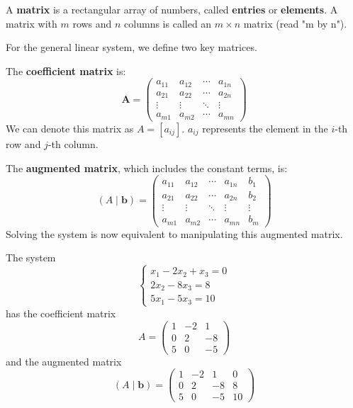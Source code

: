 \begin{definition}
A \textbf{matrix} is a rectangular array of numbers, called \textbf{entries} or \textbf{elements}. A matrix with $m$ rows and $n$ columns is called an $m \times n$ matrix (read "m by n").
\end{definition}

For the general linear system, we define two key matrices.

The \textbf{coefficient matrix} is:
\[ \textbf{A} = \begin{pmatrix}
a_{11} & a_{12} & \cdots & a_{1n} \\
a_{21} & a_{22} & \cdots & a_{2n} \\
\vdots & \vdots & \ddots & \vdots \\
a_{m1} & a_{m2} & \cdots & a_{mn}
\end{pmatrix} \]
We can denote this matrix as $A = [a_{ij}]$. $a_{ij}$ represents the element in the $i$-th row and $j$-th column.

The \textbf{augmented matrix}, which includes the constant terms, is:
\[ (A \mid \mathbf{b}) = \left(\begin{array}{cccc|c}
a_{11} & a_{12} & \cdots & a_{1n} & b_1 \\
a_{21} & a_{22} & \cdots & a_{2n} & b_2 \\
\vdots & \vdots & \ddots & \vdots & \vdots \\
a_{m1} & a_{m2} & \cdots & a_{mn} & b_m
\end{array}\right) \]
Solving the system is now equivalent to manipulating this augmented matrix.

\begin{example}
The system
\[
\begin{cases}
x_1 - 2x_2 + x_3 = 0 \\
2x_2 - 8x_3 = 8 \\
5x_1 - 5x_3 = 10
\end{cases}
\]
has the coefficient matrix
\[ A = \begin{pmatrix} 1 & -2 & 1 \\ 0 & 2 & -8 \\ 5 & 0 & -5 \end{pmatrix} \]
and the augmented matrix
\[ (A \mid \mathbf{b}) = \left(\begin{array}{ccc|c} 1 & -2 & 1 & 0 \\ 0 & 2 & -8 & 8 \\ 5 & 0 & -5 & 10 \end{array}\right) \]
\end{example}

